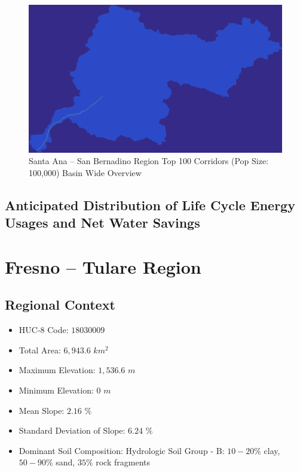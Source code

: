         \begin{figure}[!h]
            \begin{center}
            \includegraphics[width=5.5in]{figures/SanBernadino_PathwayLarge.png}   
            \caption{Santa Ana -- San Bernadino Region Top 100 Corridors (Pop Size: 100,000) Basin Wide Overview}
            \label{fig:SASBsolutionOverview}
            \end{center}
        \end{figure}
    
    \subsection{Anticipated Distribution of Life Cycle Energy Usages and Net Water Savings}

\section{Fresno -- Tulare Region}

    \subsection{Regional Context}

    \begin{itemize}
      \setlength{\itemsep}{0cm}
      \setlength{\parskip}{0cm}
        \item HUC-8 Code: $18030009$
        \item Total Area: $6,943.6$ $km^2$
        \item Maximum Elevation: $1,536.6$ $m$
        \item Minimum Elevation: $0$ $m$
        \item Mean Slope: $2.16$ $\%$
        \item Standard Deviation of Slope: $6.24$ $\%$
        \item Dominant Soil Composition: Hydrologic Soil Group - B: $10-20\%$ clay, $50-90\%$ sand, $35\%$ rock fragments
    \end{itemize}

